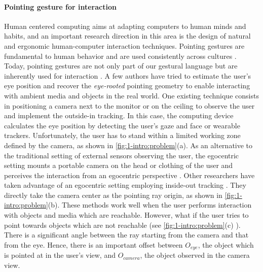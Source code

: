 \paragraph{Pointing gesture for interaction}
Human centered computing aims at adapting computers to human minds and habits, and an important research direction in this area is the design of natural and ergonomic human-computer interaction techniques.
Pointing gestures are fundamental to human behavior \cite{Matthews2012} and are used consistently across cultures  \cite{McNeill2000}.  Today, pointing gestures are not only part of our gestural language but are inherently used for interaction \cite{Nanayakkara2013a}.
A few authors have tried to estimate the user's eye position and recover the \textit{eye-rooted} pointing geometry to enable interacting with ambient media and objects in the real world. One existing technique consists in positioning a camera next to the monitor or on the ceiling to observe the user and implement the outside-in tracking. In this case, the computing device calculates the eye position by detecting the user's gaze and face or wearable trackers. Unfortunately, the user has to stand within a limited working zone defined by the camera, as shown in \figurename{\ref{fig:1-intro:problem}(a)}.
As an alternative to the traditional setting of external sensors observing the user, the egocentric setting mounts a portable camera on the head or clothing of the user and perceives the interaction from an egocentric perspective \cite{Fathi2011,Li2015}. 
Other researchers have taken advantage of an egocentric setting employing inside-out tracking \cite{Harrison2011,Mistry2009}. 
They directly take the camera center as the pointing ray origin, as shown in \figurename{\ref{fig:1-intro:problem}(b)}. These methods work well when the user performs interaction with objects and media which are reachable.
However, what if the user tries to point towards objects which are not reachable (see \figurename{\ref{fig:1-intro:problem}(c)} ). There is a significant angle between the ray starting from the camera and that from the eye. Hence, there is an important offset between $O_{eye}$, the object which is pointed at in the user's view, and $O_{camera}$, the object observed in the camera view.
